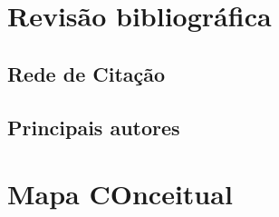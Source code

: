 \section{Revisão bibliográfica}
\subsection{Rede de Citação}
\subsection{Principais autores}


\section{Mapa COnceitual}
\lipsum[1]







